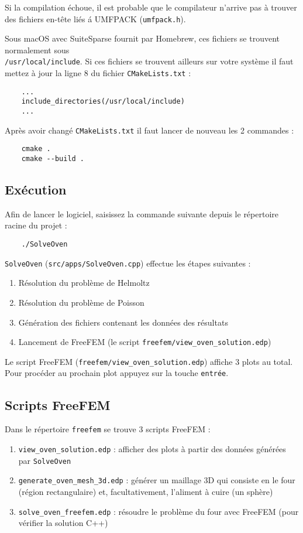 Si la compilation échoue, il est probable que le compilateur n'arrive
pas à trouver des fichiers en-tête liés á UMFPACK (\verb|umfpack.h|).

Sous macOS avec SuiteSparse fournit par Homebrew, ces fichiers se trouvent
normalement sous \\
\verb|/usr/local/include|. Si ces fichiers se trouvent
ailleurs sur votre système il faut mettez à jour la ligne $8$ du fichier
\verb|CMakeLists.txt| :
\begin{verbatim}
    ...
    include_directories(/usr/local/include)
    ...
\end{verbatim}

Après avoir changé \verb|CMakeLists.txt| il faut lancer de nouveau les
2 commandes :
\begin{verbatim}
    cmake .
    cmake --build .
\end{verbatim}

\subsection{Exécution}

Afin de lancer le logiciel, saisissez la commande suivante depuis le
répertoire racine du projet :
\begin{verbatim}
    ./SolveOven
\end{verbatim}

\verb|SolveOven| (\verb|src/apps/SolveOven.cpp|) effectue les étapes suivantes :
\begin{enumerate}
    \item Résolution du problème de Helmoltz
    \item Résolution du problème de Poisson
    \item Génération des fichiers contenant les données des résultats
    \item Lancement de FreeFEM (le script \verb|freefem/view_oven_solution.edp|)
\end{enumerate}

\vspace{2mm}

Le script FreeFEM (\verb|freefem/view_oven_solution.edp|) affiche 3 plots au total.
Pour procéder au prochain plot appuyez sur la touche \verb|entrée|.

\subsection{Scripts FreeFEM}
Dans le répertoire \verb|freefem| se trouve 3 scripts FreeFEM :
\begin{enumerate}
    \item \verb|view_oven_solution.edp| : afficher des plots à partir
    des données générées par \verb|SolveOven|
    \item \verb|generate_oven_mesh_3d.edp| : générer un maillage 3D qui
    consiste en le four (région rectangulaire) et, facultativement, l'aliment
    à cuire (un sphère)
    \item \verb|solve_oven_freefem.edp| : résoudre le problème du four avec
    FreeFEM (pour vérifier la solution C++)
\end{enumerate}

